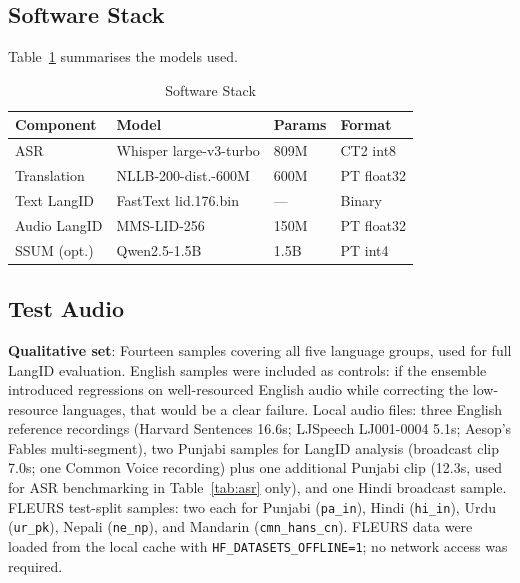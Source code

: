 \documentclass[12pt, onecolumn]{IEEEtran}
\begin{document}
\subsection{Software Stack}

Table~\ref{tab:software} summarises the models used.

\begin{table}[htbp]
\caption{Software Stack}
\label{tab:software}
\begin{center}
\begin{tabular}{llll}
\toprule
\textbf{Component} & \textbf{Model} & \textbf{Params} & \textbf{Format} \\
\midrule
ASR & Whisper large-v3-turbo & 809M & CT2 int8 \\
Translation & NLLB-200-dist.-600M & 600M & PT float32 \\
Text LangID & FastText lid.176.bin & --- & Binary \\
Audio LangID & MMS-LID-256 & 150M & PT float32 \\
SSUM (opt.) & Qwen2.5-1.5B & 1.5B & PT int4 \\
\bottomrule
\end{tabular}
\end{center}
\end{table}

\subsection{Test Audio}

\textbf{Qualitative set}: Fourteen samples covering all five language groups, used for full LangID evaluation. English samples were included as controls: if the ensemble introduced regressions on well-resourced English audio while correcting the low-resource languages, that would be a clear failure. Local audio files: three English reference recordings (Harvard Sentences 16.6s; LJSpeech LJ001-0004 5.1s; Aesop's Fables multi-segment), two Punjabi samples for LangID analysis (broadcast clip 7.0s; one Common Voice recording) plus one additional Punjabi clip (12.3s, used for ASR benchmarking in Table~\ref{tab:asr} only), and one Hindi broadcast sample. FLEURS test-split samples: two each for Punjabi (\texttt{pa\_in}), Hindi (\texttt{hi\_in}), Urdu (\texttt{ur\_pk}), Nepali (\texttt{ne\_np}), and Mandarin (\texttt{cmn\_hans\_cn}). FLEURS data were loaded from the local cache with \texttt{HF\_DATASETS\_OFFLINE=1}; no network access was required.
\end{document}
